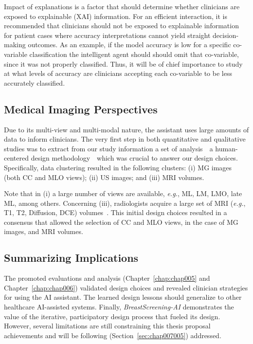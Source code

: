 Impact of explanations is a factor that should determine whether clinicians are exposed to explainable (\ac{XAI}) information.
For an efficient interaction, it is recommended that clinicians should not be exposed to explainable information for patient cases where accuracy interpretations cannot yield straight decision-making outcomes.
As an example, if the model accuracy is low for a specific co-variable classification the intelligent agent should should omit that co-variable, since it was not properly classified.
Thus, it will be of chief importance to study at what levels of accuracy are clinicians accepting each co-variable to be less accurately classified.

\subsection{Medical Imaging Perspectives}
\label{sec:chap007004004}

Due to its multi-view and multi-modal nature, the assistant uses large amounts of data to inform clinicians.
The very first step in both quantitative and qualitative studies was to extract from our study information a set of analysis~\textendash~a human-centered design methodology~\textendash~which was crucial to answer our design choices.
Specifically, data clustering resulted in the following clusters:
(i) \ac{MG} images (both \ac{CC} and \ac{MLO} views);
(ii) \ac{US} images; and
(iii) \ac{MRI} volumes.

Note that in (i) a large number of views are available, {\it e.g.}, ML, LM, LMO, late ML, among others.
Concerning (iii), radiologists acquire a large set of \ac{MRI} ({\it e.g.}, T1, T2, Diffusion, \acl{DCE}) volumes~\cite{seifabadi2019correlation}.
This initial design choices resulted in a consensus that allowed the selection of \ac{CC} and \ac{MLO} views, in the case of \ac{MG} images, and \ac{MRI} volumes.

\subsection{Summarizing Implications}
\label{sec:chap007004005}

The promoted evaluations and analysis (Chapter~\ref{chap:chap005} and Chapter~\ref{chap:chap006}) validated design choices and revealed clinician strategies for using the \ac{AI} assistant.
The learned design lessons should generalize to other healthcare \ac{AI}-assisted systems.
Finally, {\it BreastScreening-AI} demonstrates the value of the iterative, participatory design process that fueled its design.
However, several limitations are still constraining this thesis proposal achievements and will be following (Section~\ref{sec:chap007005}) addressed.

